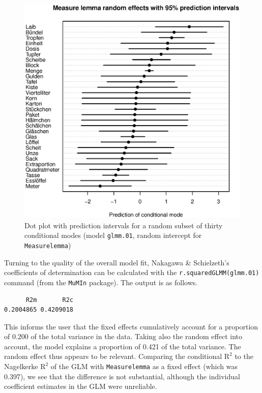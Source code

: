 \begin{figure}
  \centering
  \includegraphics[width=\textwidth]{eps/ranef_selection}
  \caption{Dot plot with prediction intervals for a random subset of thirty conditional modes (model \texttt{glmm.01}, random intercept for \texttt{Measurelemma})}
  \label{fig:condmodes}
\end{figure}

Turning to the quality of the overall model fit, Nakagawa \& Schielzeth's coefficients of determination can be calculated with the \texttt{r.squaredGLMM(glmm.01)} command (from the \texttt{MuMIn} package).
The output is as follows.

\vspace{0.5\baselineskip}

\begin{lstlisting}
      R2m       R2c
0.2004865 0.4209018
\end{lstlisting}

This informs the user that the fixed effects cumulatively account for a proportion of 0.200 of the total variance in the data.
Taking also the random effect into account, the model explains a proportion of 0.421 of the total variance.
The random effect thus appears to be relevant.
Comparing the conditional $\textrm{R}^{\textrm{2}}$ to the Nagelkerke $\textrm{R}^{\textrm{2}}$ of the GLM with \texttt{Measurelemma} as a fixed effect (which was 0.397), we see that the difference is not substantial, although the individual coefficient estimates in the GLM were unreliable.

